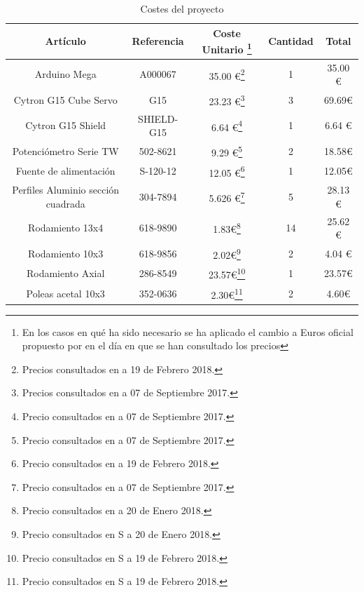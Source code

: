     \begin{table}[H]
    \caption{Costes del proyecto}
    \label{tab:presupuesto}
    \begin{center}
    \begin{minipage}{\textwidth}
    \begin{tabular}{ |c|c|c|c|c| }
    \hline
    \textbf{Artículo} & \textbf{Referencia} & \textbf{Coste Unitario} \footnote{En los casos en qué ha sido necesario se ha aplicado el cambio a Euros oficial propuesto por \cite{bancoEspana} en el día en que se han consultado los precios} & \textbf{Cantidad} & \textbf{Total} \\
    \hline
    \hline
    Arduino Mega & A000067 & 35.00 \euro\footnote{Precios consultados en \cite{arduinoStore} a 19 de Febrero 2018.} & 1 & 35.00 \euro\\
    Cytron G15 Cube Servo & G15 & 23.23 \euro\footnote{Precios consultados en \cite{cytronStore} a 07 de Septiembre 2017.} & 3 & 69.69\euro \\
    Cytron G15 Shield & SHIELD-G15 & 6.64 \euro\footnote{Precio consultados en \cite{cytronStore} a 07 de Septiembre 2017.} & 1 & 6.64 \euro\\
    \hline
    \hline
    Potenciómetro Serie TW & 502-8621 &  9.29 \euro\footnote{Precio consultados en \cite{rsStore} a 07 de Septiembre 2017.} & 2 & 18.58\euro \\
    Fuente de alimentación & S-120-12  &  12.05 \euro\footnote{Precio consultados en \cite{aliexpres} a 19 de Febrero 2018.} & 1 & 12.05\euro \\
    \hline
    \hline
    Perfiles Aluminio sección cuadrada & 304-7894 & 5.626 \euro\footnote{Precio consultados en \cite{rsStore} a 07 de Septiembre 2017.} & 5 & 28.13 \euro \\
    Rodamiento 13x4 & 618-9890 & 1.83\euro\footnote{Precio consultados en \cite{rsStore} a 20 de Enero 2018.} & 14 & 25.62 \euro \\
    Rodamiento 10x3 & 618-9856 & 2.02\euro\footnote{Precio consultados en \cite{rsStore}S a 20 de Enero 2018.} & 2 & 4.04 \euro \\
    Rodamiento Axial & 286-8549 & 23.57\euro\footnote{Precio consultados en \cite{rsStore}S a 19 de Febrero 2018.} & 1 & 23.57\euro \\
    Poleas acetal 10x3 & 352-0636 & 2.30\euro\footnote{Precio consultados en \cite{rsStore}S a 19 de Febrero 2018.} & 2 & 4.60\euro \\

\end{tabular}
\end{minipage}
\end{center}
\end{table}
